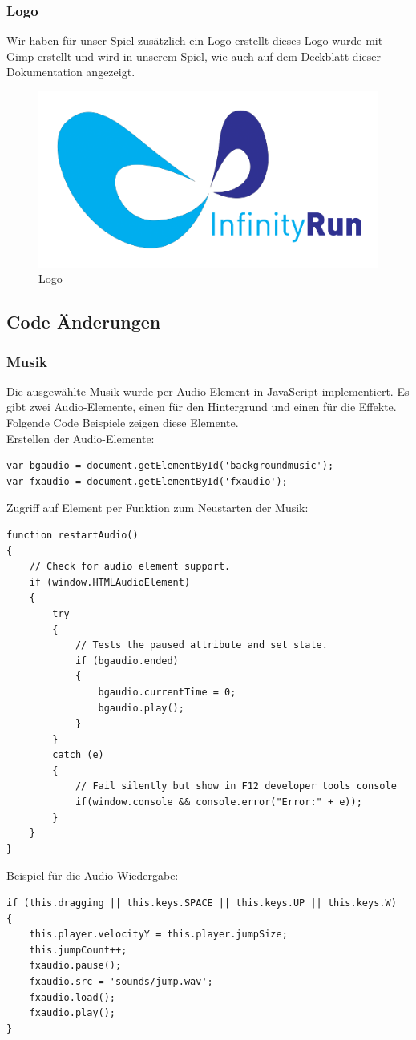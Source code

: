 \subsubsection{Logo}
Wir haben für unser Spiel zusätzlich ein Logo erstellt dieses Logo wurde mit Gimp erstellt und wird in unserem Spiel, wie auch auf dem Deckblatt dieser Dokumentation angezeigt.
\begin{figure}[htb]
	\centering
	\includegraphics[scale=1]{../../image/logo.png}
	\caption{Logo}
	\label{pic:logo}
\end{figure}
\newpage
\subsection{Code Änderungen}
\subsubsection{Musik}
Die ausgewählte Musik wurde per Audio-Element in JavaScript implementiert. Es gibt zwei Audio-Elemente, einen für den Hintergrund und einen für die Effekte. Folgende Code Beispiele zeigen diese Elemente.\\
Erstellen der Audio-Elemente:
\lstset{language=java}
\begin{lstlisting}[frame=single]
var bgaudio = document.getElementById('backgroundmusic');
var fxaudio = document.getElementById('fxaudio');
\end{lstlisting}
Zugriff auf Element per Funktion zum Neustarten der Musik:
\lstset{language=java}
\begin{lstlisting}[frame=single]
function restartAudio() 
{
	// Check for audio element support.
	if (window.HTMLAudioElement) 
	{
		try 
		{                     
			// Tests the paused attribute and set state. 
			if (bgaudio.ended) 
			{
				bgaudio.currentTime = 0;
				bgaudio.play();
			}                    
		}
		catch (e) 
		{
			// Fail silently but show in F12 developer tools console
			if(window.console && console.error("Error:" + e));
		}
	}
}
\end{lstlisting}
Beispiel für die Audio Wiedergabe:
\lstset{language=java}
\begin{lstlisting}[frame=single]
if (this.dragging || this.keys.SPACE || this.keys.UP || this.keys.W) 
{
	this.player.velocityY = this.player.jumpSize;
	this.jumpCount++;
	fxaudio.pause();
	fxaudio.src = 'sounds/jump.wav';
	fxaudio.load();
	fxaudio.play();	
}
\end{lstlisting}
\newpage
